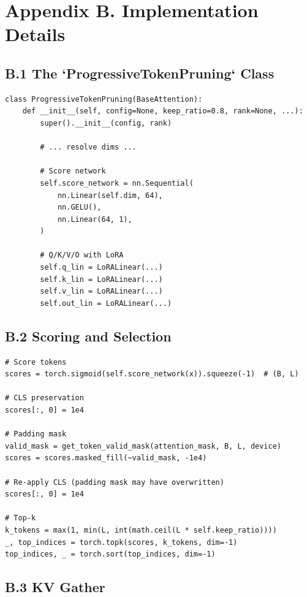 
\section{Appendix B. Implementation Details}

\subsection{B.1 The `ProgressiveTokenPruning` Class}

\begin{lstlisting}
class ProgressiveTokenPruning(BaseAttention):
    def __init__(self, config=None, keep_ratio=0.8, rank=None, ...):
        super().__init__(config, rank)
        
        # ... resolve dims ...
        
        # Score network
        self.score_network = nn.Sequential(
            nn.Linear(self.dim, 64),
            nn.GELU(),
            nn.Linear(64, 1),
        )
        
        # Q/K/V/O with LoRA
        self.q_lin = LoRALinear(...)
        self.k_lin = LoRALinear(...)
        self.v_lin = LoRALinear(...)
        self.out_lin = LoRALinear(...)
\end{lstlisting}

\subsection{B.2 Scoring and Selection}

\begin{lstlisting}
# Score tokens
scores = torch.sigmoid(self.score_network(x)).squeeze(-1)  # (B, L)

# CLS preservation
scores[:, 0] = 1e4

# Padding mask
valid_mask = get_token_valid_mask(attention_mask, B, L, device)
scores = scores.masked_fill(~valid_mask, -1e4)

# Re-apply CLS (padding mask may have overwritten)
scores[:, 0] = 1e4

# Top-k
k_tokens = max(1, min(L, int(math.ceil(L * self.keep_ratio))))
_, top_indices = torch.topk(scores, k_tokens, dim=-1)
top_indices, _ = torch.sort(top_indices, dim=-1)
\end{lstlisting}

\subsection{B.3 KV Gather}

